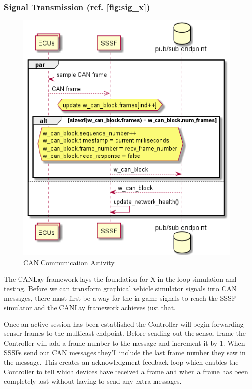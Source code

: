 \documentclass[letterpaper,twocolumn,12pt]{article}
\begin{document}
\subsubsection{Signal Transmission (ref. \ref{fig:sig_x})} \label{sec:sig_x}





\begin{figure}[t!]
    \centering
    \includegraphics[scale=0.8]{out/images/can_exchange/can_exchange.png}
    \caption{CAN Communication Activity}
    \label{fig:can_x}
\end{figure}

The CANLay framework lays the foundation for X-in-the-loop simulation and testing.
Before we can transform graphical vehicle simulator signals into CAN messages, there must first be a way for the in-game signals to reach the SSSF simulator and the CANLay framework achieves just that. 

Once an active session has been established the Controller will begin forwarding sensor frames to the multicast endpoint. Before sending out the sensor frame the Controller will add a frame number to the message and increment it by 1. When SSSFs send out CAN messages they’ll include the last frame number they saw in the message. This creates an acknowledgment feedback loop which enables the Controller to tell which devices have received a frame and when a frame has been completely lost without having to send any extra messages.
\end{document}
